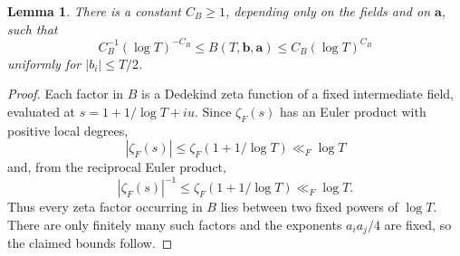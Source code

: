 \documentclass[twoside,reqno,11pt,a4paper]{amsart}
\numberwithin{equation}{section}
\theoremstyle{plain}
\newtheorem{lem}[thm]{Lemma}
\theoremstyle{definition}
\theoremstyle{remark}
\renewcommand{\le}{\leqslant}
\renewcommand{\ge}{\geqslant}
\begin{document}
\begin{lem}\label{B-poly-bounds}
There is a constant $C_B\ge1$, depending only on the fields and on $\mathbf a$, such that
\begin{equation*}
        C_B^{-1}(\log T)^{-C_B}
        \le B(T,\mathbf b,\mathbf a)
        \le C_B(\log T)^{C_B}
\end{equation*}
uniformly for $|b_i|\le  T/2$.
\end{lem}
\begin{proof}
Each factor in $B$ is a Dedekind zeta function of a fixed intermediate field, evaluated at $s=1+1/\log T+i u$.  Since $\zeta_F(s)$ has an Euler product with positive local degrees,
\begin{equation*}
        |\zeta_F(s)|\le  \zeta_F(1+1/\log T)\ll_F \log T
\end{equation*}
and, from the reciprocal Euler product,
\begin{equation*}
        |\zeta_F(s)|^{-1}\le  \zeta_F(1+1/\log T)\ll_F\log T.
\end{equation*}
Thus every zeta factor occurring in $B$ lies between two fixed powers of $\log T$.  There are only finitely many such factors and the exponents $a_i a_j/4$ are fixed, so the claimed bounds follow.
\end{proof}
\end{document}
